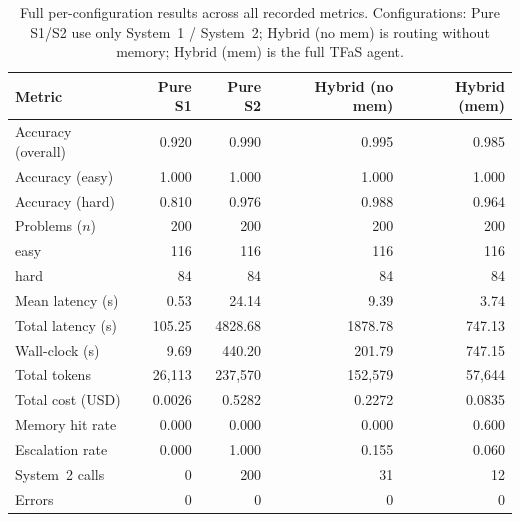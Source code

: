 \begin{table}[t]
  \centering
  \caption{Full per-configuration results across all recorded metrics. Configurations: Pure S1/S2 use only System~1 / System~2; Hybrid (no mem) is routing without memory; Hybrid (mem) is the full TFaS agent.}
  \label{tab:summary}
  \begin{tabular}{lrrrr}
    \toprule
    \textbf{Metric} & \textbf{Pure S1} & \textbf{Pure S2} & \textbf{Hybrid (no mem)} & \textbf{Hybrid (mem)} \\
    \midrule
    Accuracy (overall) & 0.920 & 0.990 & 0.995 & 0.985 \\
    Accuracy (easy) & 1.000 & 1.000 & 1.000 & 1.000 \\
    Accuracy (hard) & 0.810 & 0.976 & 0.988 & 0.964 \\
    \addlinespace
    Problems ($n$) & 200 & 200 & 200 & 200 \\
    \quad easy & 116 & 116 & 116 & 116 \\
    \quad hard & 84 & 84 & 84 & 84 \\
    \addlinespace
    Mean latency (s) & 0.53 & 24.14 & 9.39 & 3.74 \\
    Total latency (s) & 105.25 & 4828.68 & 1878.78 & 747.13 \\
    Wall-clock (s) & 9.69 & 440.20 & 201.79 & 747.15 \\
    \addlinespace
    Total tokens & 26,113 & 237,570 & 152,579 & 57,644 \\
    Total cost (USD) & 0.0026 & 0.5282 & 0.2272 & 0.0835 \\
    \addlinespace
    Memory hit rate & 0.000 & 0.000 & 0.000 & 0.600 \\
    Escalation rate & 0.000 & 1.000 & 0.155 & 0.060 \\
    System~2 calls & 0 & 200 & 31 & 12 \\
    Errors & 0 & 0 & 0 & 0 \\
    \bottomrule
  \end{tabular}
\end{table}
